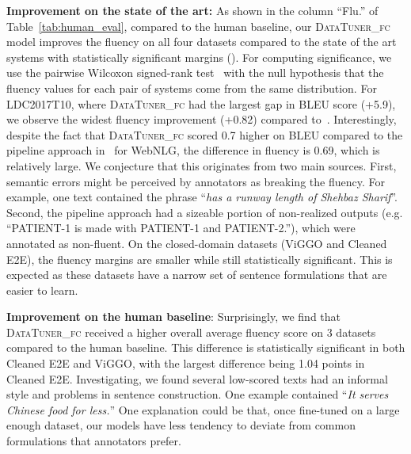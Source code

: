 \documentclass[11pt]{article}
\newcommand{\webnlg}{WebNLG\xspace}
\newcommand{\ldc}{LDC2017T10\xspace}
\newcommand{\viggo}{ViGGO\xspace}
\newcommand{\cleanedee}{Cleaned E2E\xspace}
\newcommand{\systemFcPost}{\textsc{DataTuner\_fc}\xspace}
\theoremstyle{definition}
\theoremstyle{break}
\begin{document}
\textbf{Improvement on the state of the art:} As shown in the column ``Flu.'' of Table~\ref{tab:human_eval}, compared to the human baseline, our \systemFcPost model improves the fluency on all four datasets compared to the state of the art systems with statistically significant margins (). For computing significance, we use the pairwise Wilcoxon signed-rank test~\cite{wilcoxon1992individual} with the null hypothesis that the fluency values for each pair of systems come from the same distribution.
For \ldc, where \systemFcPost had the largest gap in BLEU score (+5.9), we observe the widest fluency improvement (+0.82) compared to~.
Interestingly, despite the fact that \systemFcPost scored 0.7 higher on BLEU compared to the pipeline approach in~\cite{castro-ferreira-etal-2019-neural} for \webnlg, the difference in fluency is 0.69, which is relatively large. We conjecture that this originates from two main sources. First, semantic errors might be perceived by annotators as breaking the fluency. For example, one text contained the phrase ``\textit{has a runway length of Shehbaz Sharif}''. Second, the pipeline approach had a sizeable portion of non-realized outputs (e.g. ``PATIENT-1 is made with PATIENT-1 and PATIENT-2.''), which were annotated as non-fluent. 
On the closed-domain datasets (\viggo and \cleanedee), the fluency margins are smaller while still statistically significant. This is expected as these datasets have a narrow set of sentence formulations that are easier to learn.


\textbf{Improvement on the human baseline}: Surprisingly, we find that \systemFcPost received a higher overall average fluency score on 3 datasets compared to the human baseline. This difference is statistically significant in both \cleanedee and \viggo, with the largest difference being 1.04 points in \cleanedee. Investigating, we found several low-scored texts had an informal style and problems in sentence construction. One example contained ``\textit{It serves Chinese food for less.}'' One explanation could be that, once fine-tuned on a large enough dataset, our models have less tendency to deviate from common formulations that annotators prefer.
\end{document}
